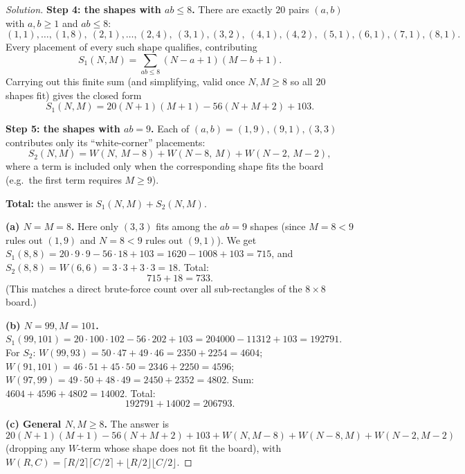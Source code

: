\documentclass[11pt]{article}
\theoremstyle{definition}
\begin{document}
\begin{proof}[Solution]
\textbf{Step 4: the shapes with $ab\le8$.} There are exactly $20$ pairs $(a,b)$ with $a,b\ge1$ and $ab\le8$:
\[
(1,1),\dots,(1,8),\ (2,1),\dots,(2,4),\ (3,1),(3,2),\ (4,1),(4,2),\ (5,1),(6,1),(7,1),(8,1).
\]
Every placement of every such shape qualifies, contributing
\[
S_1(N,M)=\sum_{ab\le8}(N-a+1)(M-b+1).
\]
Carrying out this finite sum (and simplifying, valid once $N,M\ge8$ so all $20$ shapes fit) gives the closed form
\[
S_1(N,M)=20(N+1)(M+1)-56(N+M+2)+103.
\]

\textbf{Step 5: the shapes with $ab=9$.} Each of $(a,b)=(1,9),(9,1),(3,3)$ contributes only its ``white-corner'' placements:
\[
S_2(N,M)=W(N,\,M-8)+W(N-8,\,M)+W(N-2,\,M-2),
\]
where a term is included only when the corresponding shape fits the board (e.g.\ the first term requires $M\ge9$).

\textbf{Total:} the answer is $S_1(N,M)+S_2(N,M)$.

\textbf{(a) $N=M=8$.} Here only $(3,3)$ fits among the $ab=9$ shapes (since $M=8<9$ rules out $(1,9)$ and $N=8<9$ rules out $(9,1)$). We get $S_1(8,8)=20\cdot9\cdot9-56\cdot18+103=1620-1008+103=715$, and $S_2(8,8)=W(6,6)=3\cdot3+3\cdot3=18$. Total:
\[
715+18=\boxed{733}.
\]
(This matches a direct brute-force count over all sub-rectangles of the $8\times8$ board.)

\textbf{(b) $N=99,M=101$.} $S_1(99,101)=20\cdot100\cdot102-56\cdot202+103=204000-11312+103=192791$. For $S_2$: $W(99,93)=50\cdot47+49\cdot46=2350+2254=4604$; $W(91,101)=46\cdot51+45\cdot50=2346+2250=4596$; $W(97,99)=49\cdot50+48\cdot49=2450+2352=4802$. Sum: $4604+4596+4802=14002$. Total:
\[
192791+14002=\boxed{206793}.
\]

\textbf{(c) General $N,M\ge8$.} The answer is
\[
20(N+1)(M+1)-56(N+M+2)+103+W(N,M-8)+W(N-8,M)+W(N-2,M-2)
\]
(dropping any $W$-term whose shape does not fit the board), with $W(R,C)=\lceil R/2\rceil\lceil C/2\rceil+\lfloor R/2\rfloor\lfloor C/2\rfloor$.
\end{proof}
\end{document}
